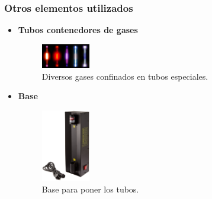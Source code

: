 \documentclass{beamer}
\begin{document}




\begin{frame}
\frametitle{Otros elementos utilizados}
\begin{itemize}
	\item \textbf{Tubos contenedores de gases}
		\begin{figure}[h!]
			\centering
			\includegraphics[width=0.2\textwidth,height = 0.2\textheight]{tubes}
			\caption{Diversos gases confinados en tubos especiales.}
		\end{figure}
	\item \textbf{Base}
		\begin{figure}[h!]
			\centering
			\includegraphics[width=0.2\textwidth,height = 0.3\textheight]{base}
			\caption{Base para poner los tubos.}
		\end{figure}
\end{itemize}
\end{frame}

\end{document}
